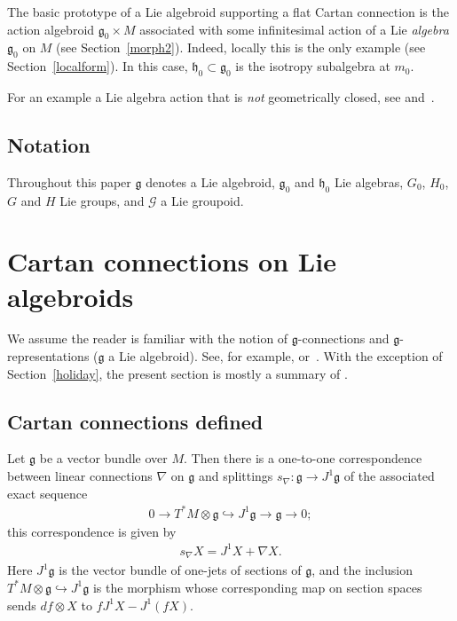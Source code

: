 \documentclass[11pt]{article}
\newcommand\monomorphism{\hookrightarrow}
\numberwithin{equation}{section}
\begin{document}
The basic prototype of a Lie algebroid supporting a f\/lat Cartan
connection is the action algebroid ${\mathfrak g}_0 \times M$
associated with some inf\/initesimal action of a Lie {\em algebra}
${\mathfrak g}_0$ on $M$ (see Section~\ref{morph2}). Indeed, locally this is
the only example (see Section~\ref{localform}). In this case, ${\mathfrak
  h}_0 \subset {\mathfrak g}_0$ is the isotropy subalgebra at $m_0$.

For an example a Lie algebra action that is {\em not} geometrically
closed, see \cite[Example~8]{Kamber_Michor_04} and~\cite{Kowalski_97}.


\setcounter{section}{1}
\setcounter{subsection}{5}
\setcounter{subsubsection}{0}
\setcounter{TheoremBlaom}{2}
\setcounter{equation}{0}
\subsection{Notation}

Throughout this paper ${\mathfrak g} $ denotes a
Lie algebroid, ${\mathfrak g}_0 $ and ${\mathfrak h}_0$ Lie algebras,
$G_0$, $H_0$, $G$ and $H$ Lie groups, and ${\mathcal G}$ a Lie
groupoid.


\section{Cartan connections on Lie algebroids}\label{section1}

We assume the reader is familiar with the notion of $\mathfrak
g$-connections and $\mathfrak g$-representations ($\mathfrak g$ a Lie
algebroid).
See, for example, \cite{Blaom_05} or~\cite{Blaom_12}.  With the
exception of Section~\ref{holiday}, the present section is mostly a summary
of \cite{Blaom_05}.

\subsection{Cartan connections def\/ined}\label{skoj}

Let ${\mathfrak g} $ be a vector bundle over $M$. Then there is a
one-to-one correspondence between linear connections $\nabla$ on
${\mathfrak g}$ and splittings $s_\nabla \colon {\mathfrak g}
\rightarrow J^1{\mathfrak g} $ of the associated exact sequence
\begin{gather*}
                 0\rightarrow T^*\!M\otimes{\mathfrak g}\monomorphism J^1{\mathfrak
                 g}\rightarrow{\mathfrak g}\rightarrow 0;
\end{gather*}
this correspondence is given by
\begin{gather*}
  s_\nabla X=J^1X + \nabla X.%
\end{gather*}
Here $J^1 {\mathfrak g} $ is the vector bundle of one-jets of sections
of $\mathfrak g$, and the inclusion $T^*\!M\otimes{\mathfrak
  g}\monomorphism J^1{\mathfrak g}$ is the morphism whose
corresponding map on section spaces sends $df \otimes X$ to $ f J^1 X
- J^1 (fX)$.
\end{document}
